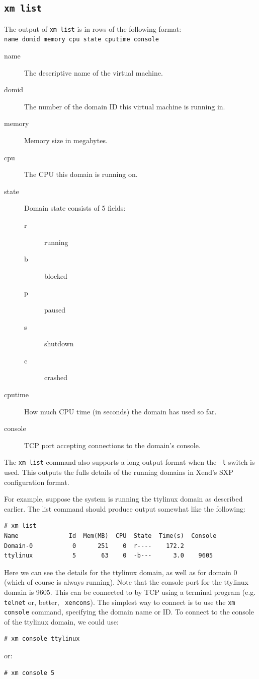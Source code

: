 \documentclass[11pt,twoside,final,openright]{xenstyle}
\begin{document}
\subsection{\tt xm list}

The output of {\tt xm list} is in rows of the following format:\\
\verb_name domid memory cpu state cputime console_

\begin{description}
\item[name]  The descriptive name of the virtual machine.
\item[domid] The number of the domain ID this virtual machine is running in.
\item[memory] Memory size in megabytes.
\item[cpu]   The CPU this domain is running on.
\item[state] Domain state consists of 5 fields:
  \begin{description}
  \item[r] running
  \item[b] blocked
  \item[p] paused
  \item[s] shutdown
  \item[c] crashed
  \end{description}
\item[cputime] How much CPU time (in seconds) the domain has used so far.
\item[console] TCP port accepting connections to the domain's console.
\end{description}

The {\tt xm list} command also supports a long output format when the
{\tt -l} switch is used.  This outputs the fulls details of the
running domains in Xend's SXP configuration format.

For example, suppose the system is running the ttylinux domain as
described earlier.  The list command should produce output somewhat
like the following:
\begin{verbatim}
# xm list
Name              Id  Mem(MB)  CPU  State  Time(s)  Console
Domain-0           0      251    0  r----    172.2        
ttylinux           5       63    0  -b---      3.0    9605
\end{verbatim}

Here we can see the details for the ttylinux domain, as well as for
domain 0 (which of course is always running).  Note that the console
port for the ttylinux domain is 9605.  This can be connected to by TCP
using a terminal program (e.g. {\tt telnet} or, better, {\tt
xencons}).  The simplest way to connect is to use the {\tt xm console}
command, specifying the domain name or ID.  To connect to the console
of the ttylinux domain, we could use:
\begin{verbatim}
# xm console ttylinux
\end{verbatim}
or:
\begin{verbatim}
# xm console 5
\end{verbatim}
\end{document}
